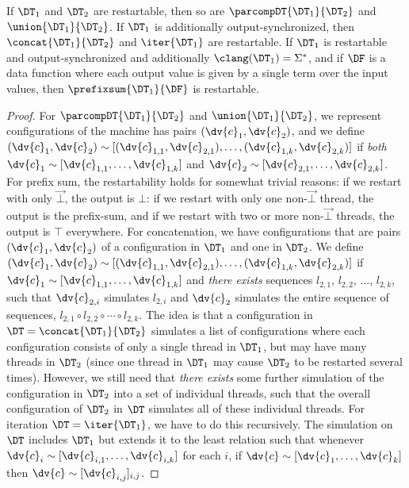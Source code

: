 \begin{theorem}
\label{dt:thm:restartability-preserved}
If $\DT_1$ and $\DT_2$ are restartable, then so
are $\parcompDT{\DT_1}{\DT_2}$ and $\union{\DT_1}{\DT_2}$.
If $\DT_1$ is additionally output-synchronized, then $\concat{\DT_1}{\DT_2}$ and $\iter{\DT_1}$ are restartable.
If $\DT_1$ is restartable and output-synchronized and additionally $\clang(\DT_1) = \Sigma^{*}$, and if $\DF$ is a data function where each output value is given by a single term over the input values, then $\prefixsum{\DT_1}{\DF}$ is restartable.
\end{theorem}
\begin{proof}
For $\parcompDT{\DT_1}{\DT_2}$ and $\union{\DT_1}{\DT_2}$, we represent configurations of the machine has pairs $(\dv{c}_1, \dv{c}_2)$, and we define $(\dv{c}_1, \dv{c}_2) \sim [(\dv{c}_{1,1},\dv{c}_{2,1}),\ldots,(\dv{c}_{1,k},\dv{c}_{2,k})]$ if \emph{both} $\dv{c}_1 \sim [\dv{c}_{1,1},\ldots,\dv{c}_{1,k}]$ and $\dv{c}_2 \sim [\dv{c}_{2,1},\ldots,\dv{c}_{2,k}]$.
For prefix sum, the restartability holds for somewhat trivial reasons: if we restart with only $\vec{\bot}$, the output is $\bot$: if we restart with only one non-$\vec{\bot}$ thread, the output is the prefix-sum, and if we restart with two or more non-$\vec{\bot}$ threads, the output is $\top$ everywhere.
For concatenation, we have configurations that are pairs $(\dv{c}_1, \dv{c}_2)$ of a configuration in $\DT_1$ and one in $\DT_2$. We define $(\dv{c}_1, \dv{c}_2) \sim [(\dv{c}_{1,1},\dv{c}_{2,1}),\ldots,(\dv{c}_{1,k},\dv{c}_{2,k})]$ if $\dv{c}_1 \sim [\dv{c}_{1,1},\ldots,\dv{c}_{1,k}]$ and \emph{there exists} sequences $l_{2,1}$, $l_{2,2}$, $\ldots$, $l_{2,k}$, such that $\dv{c}_{2,i}$ simulates $l_{2,i}$ and $\dv{c}_2$ simulates the entire sequence of sequences, $l_{2,1} \circ l_{2,2} \circ \cdots \circ l_{2,k}$. The idea is that a configuration in $\DT = \concat{\DT_1}{\DT_2}$ simulates a list of configurations where each configuration consists of only a single thread in $\DT_1$, but may have many threads in $\DT_2$ (since one thread in $\DT_1$ may cause $\DT_2$ to be restarted several times). However, we still need that \emph{there exists} some further simulation of the configuration in $\DT_2$ into a set of individual threads, such that the overall configuration of $\DT_2$ in $\DT$ simulates all of these individual threads.
For iteration $\DT = \iter{\DT_1}$, we have to do this recursively. The simulation on $\DT$ includes $\DT_1$ but extends it to the least relation such that whenever $\dv{c}_i \sim [\dv{c}_{i,1}, \ldots, \dv{c}_{i,k}]$ for each $i$, if $\dv{c} \sim [\dv{c}_1, \ldots, \dv{c}_k]$ then $\dv{c} \sim [\dv{c}_{i,j}]_{i,j}$.
\end{proof}

